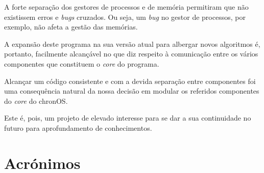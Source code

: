 \documentclass[10pt,oneside]{estiloUBI}
\newcommand{\chronOS}{\textsf{chronOS}}
\begin{document}
	A forte separação dos gestores de processos e de memória permitiram que não existissem erros e \textit{bugs} cruzados. Ou seja, um \textit{bug} no gestor de processos, por exemplo, não afeta a gestão das memórias.
	
	A expansão deste programa na sua versão atual para albergar novos algoritmos é, portanto, facilmente alcançável no que diz respeito à comunicação entre os vários componentes que constituem o \textit{core} do programa.
	
	Alcançar um código consistente e com a devida separação entre componentes foi uma consequência natural da nossa decisão em modular os referidos componentes do \textit{core} do \chronOS.
	
	Este é, pois, um projeto de elevado interesse para se dar a sua continuidade no futuro para aprofundamento de conhecimentos.
	
	
	\chapter*{Acrónimos}
    \label{sec:acron}
    
    \begin{acronym}[FCFS]
    \end{acronym}
	
\end{document}
